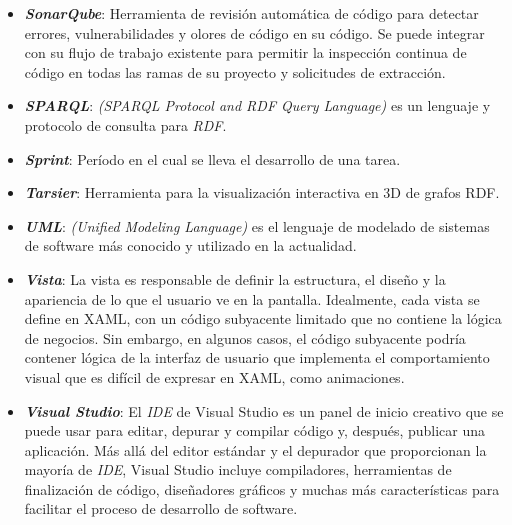 \begin{itemize}
    \item \textbf{\textit{SonarQube}}: Herramienta de revisión automática 
    de código para detectar errores, vulnerabilidades y olores de código 
    en su código. Se puede integrar con su flujo de trabajo existente 
    para permitir la inspección continua de código en todas las ramas 
    de su proyecto y solicitudes de extracción.

    \item \textbf{\textit{SPARQL}}: \emph{(SPARQL Protocol and RDF Query 
    Language)} es un lenguaje y protocolo de consulta para \emph{RDF}. 

    \item \textbf{\textit{Sprint}}: Período en el cual se lleva el 
    desarrollo de una tarea.

    \item \textbf{\textit{Tarsier}}: Herramienta para la visualización 
    interactiva en 3D de grafos RDF.\@

    \item \textbf{\textit{UML}}: \emph{(Unified Modeling Language)} es el 
    lenguaje de modelado de sistemas de software más conocido y utilizado 
    en la actualidad.

    \item \textbf{\textit{Vista}}: La vista es responsable de definir 
    la estructura, el diseño y la apariencia de lo que el usuario ve 
    en la pantalla. Idealmente, cada vista se define en XAML, con un 
    código subyacente limitado que no contiene la lógica de negocios. 
    Sin embargo, en algunos casos, el código subyacente podría contener 
    lógica de la interfaz de usuario que implementa el comportamiento 
    visual que es difícil de expresar en XAML, como animaciones.

    \item \textbf{\textit{Visual Studio}}: El \emph{IDE} de Visual Studio 
    es un panel de inicio creativo que se puede usar para editar, 
    depurar y compilar código y, después, publicar una aplicación.
    Más allá del editor estándar y el depurador que proporcionan la 
    mayoría de \emph{IDE}, Visual Studio incluye compiladores, herramientas 
    de finalización de código, diseñadores gráficos y muchas más 
    características para facilitar el proceso de desarrollo de software.


\end{itemize}
